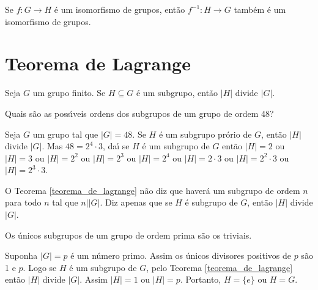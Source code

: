    
        \begin{proposicao}
            Se $f : G \to H$ é um isomorfismo de grupos, então $f^{-1} : H \to G$ também é um isomorfismo de grupos.
        \end{proposicao}


\section{Teorema de Lagrange}

\begin{teorema}\label{teorema_de_lagrange}
	Seja $G$ um grupo finito. Se $H\subseteq G$ {\'e} um subgrupo, ent{\~a}o $|H|$ divide $|G|$.
\end{teorema}

\begin{exemplo}
	Quais s{\~a}o as poss{\'\i}veis ordens dos subgrupos de um grupo de ordem 48?
	\begin{solucao}
		Seja $G$ um grupo tal que $|G|=48$. Se $H$ {\'e} um subgrupo pr\'orio de $G$, ent{\~a}o $|H|$ divide $|G|$. Mas $48=2^{4}\cdot 3$, da{\'\i} se $H$ \'e um subgrupo de $G$ ent\~ao $|H|=2$ ou $|H|=3$ ou $|H|= 2^{2}$ ou $|H|=2^{3}$ ou $|H|=2^{4}$ ou $|H|=2\cdot3$ ou $|H|=2^2\cdot 3$ ou $|H|=2^3\cdot 3$.
	\end{solucao}
\end{exemplo}

\begin{observacao}
	O Teorema \ref{teorema_de_lagrange} n{\~a}o diz que haver{\'a} um subgrupo de ordem $n$ para todo $n$ tal que $n||G|$. Diz apenas que se $H$ {\'e} subgrupo de $G$, ent{\~a}o $|H|$ divide $|G|$.
\end{observacao}

\begin{corolario}
	Os {\'u}nicos subgrupos de um grupo de ordem prima s{\~a}o os triviais.
\end{corolario}
\begin{prova}
	Suponha $|G| = p$ \'e um n\'umero primo. Assim os {\'u}nicos divisores positivos de $p$ s{\~a}o 1 e $p$. Logo se $H$ {\'e} um subgrupo de $G$, pelo Teorema \ref{teorema_de_lagrange} ent{\~a}o $|H|$ divide $|G|$. Assim $|H| = 1$ ou $|H| = p$. Portanto, $H=\{e\}$ ou $H = G$.
\end{prova}





